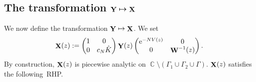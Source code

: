 \documentclass[10pt,a4paper]{amsart}
\DeclareMathOperator{\CC}{\mathbb{C}}
\DeclareMathOperator{\YY}{{\bf Y}}
\DeclareMathOperator{\XX}{{\bf X}}
\DeclareMathOperator{\WW}{{\bf W}}
\numberwithin{equation}{section}
\begin{document}
\subsection[The transformation ${\YY} \mapsto {\XX}$]{The transformation $\boldsymbol{{\YY} \mapsto {\XX}}$}
We now define the transformation $\YY \mapsto \XX$. We set
 \begin{equation*}
 \XX(z) :=
 \begin{pmatrix}
 1 & 0 \\
 0 & c_N \hat{K}
 \end{pmatrix}
 \YY(z)
 \begin{pmatrix}
 {\rm e}^{-NV(z)} & 0 \\
 0 & \WW^{-1}(z)
 \end{pmatrix}.
 \end{equation*}
By construction, $\XX(z)$ is piecewise analytic on $\CC\setminus (\Gamma_1 \cup \Gamma_2 \cup \Gamma)$. $\XX(z)$ satisfies the following~RHP.
\end{document}
